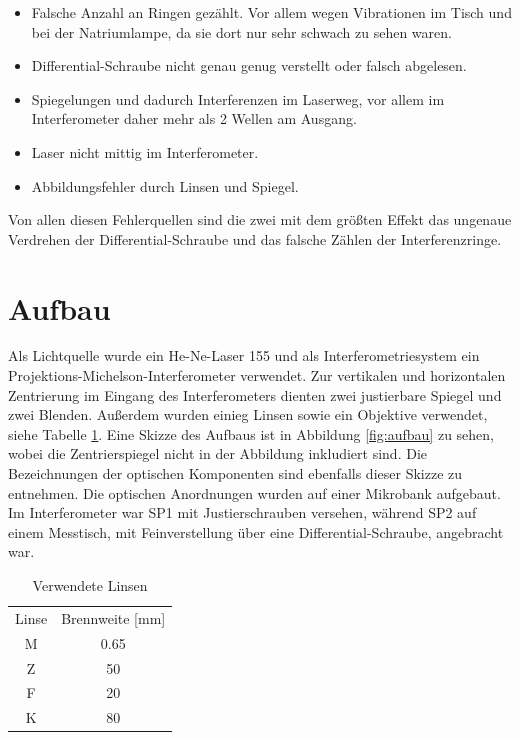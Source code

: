 \documentclass[
  headings=optiontotocandhead,
  twoside,
  openright,
  numbers=noenddot,
  toc=flat,
  11pt,
  parskip=full,
  listof=flat,
  bibliography=totoc,
  a4paper,
  DIV=14,
  BCOR=22mm,
  headheight=5mm,
  headinclude=true,
]{scrartcl}
\begin{document}
\begin{itemize}
  \item Falsche Anzahl an Ringen gezählt. Vor allem wegen Vibrationen im Tisch und bei der Natriumlampe, da sie dort nur sehr schwach zu sehen waren.
  \item Differential-Schraube nicht genau genug verstellt oder falsch abgelesen.
  \item Spiegelungen und dadurch Interferenzen im Laserweg, vor allem im Interferometer daher mehr als 2 Wellen am Ausgang.
  \item Laser nicht mittig im Interferometer.
  \item Abbildungsfehler durch Linsen und Spiegel.
\end{itemize}

Von allen diesen Fehlerquellen sind die zwei mit dem größten Effekt das ungenaue Verdrehen der Differential-Schraube und das falsche Zählen der Interferenzringe.

\section{Aufbau}

Als Lichtquelle wurde ein He-Ne-Laser 155 und als Interferometriesystem ein Projektions-Michelson-Interferometer verwendet. Zur vertikalen und horizontalen Zentrierung im Eingang des Interferometers dienten zwei justierbare Spiegel und zwei Blenden. Außerdem wurden einieg Linsen sowie ein Objektive verwendet, siehe Tabelle \ref{tab:linsen}. Eine Skizze des Aufbaus ist in Abbildung \ref{fig:aufbau} zu sehen, wobei die Zentrierspiegel nicht in der Abbildung inkludiert sind. Die Bezeichnungen der optischen Komponenten sind ebenfalls dieser Skizze zu entnehmen. Die optischen Anordnungen wurden auf einer Mikrobank aufgebaut. Im Interferometer war SP1 mit Justierschrauben versehen, während SP2 auf einem Messtisch, mit Feinverstellung über eine Differential-Schraube, angebracht war.


\begin{table}[htbp]
  \centering
  \setlength{\tabcolsep}{10pt}
  \begin{tabular}{ |c|c| }
    \multicolumn{1}{c}{Linse}  & \multicolumn{1}{c}{Brennweite [mm] } \\
    M & 0.65 \\
    Z & 50 \\
    F & 20 \\
    K & 80 \\
  \end{tabular}
  \caption{Verwendete Linsen}
  \label{tab:linsen}
\end{table}
\end{document}
